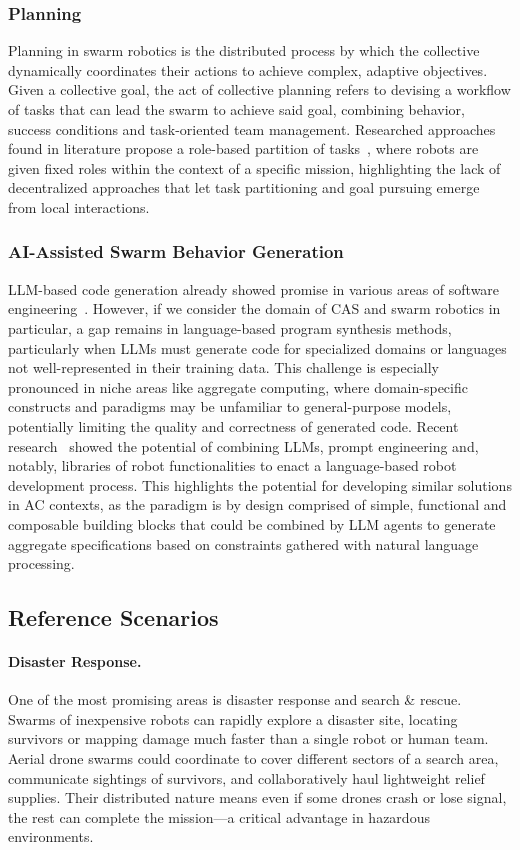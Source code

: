 \documentclass[12pt]{article}
\begin{document}
\subsubsection{Planning}
Planning in swarm robotics is the distributed process by which the collective dynamically coordinates their actions to achieve complex, adaptive objectives.
Given a collective goal, the act of collective planning refers to devising a workflow of tasks that can lead the swarm to achieve said goal, combining behavior, success conditions and task-oriented team management.
Researched approaches found in literature propose a role-based partition of tasks~\cite{sampedro2016flexible}, where robots are given fixed roles within the context of a specific mission, highlighting the lack
of decentralized approaches that let task partitioning and goal pursuing emerge from local interactions.

\subsubsection{AI-Assisted Swarm Behavior Generation}
LLM-based code generation already showed promise in various areas of software engineering~\cite{hudson2024software,zhou2025large,he2025llm}. However, if we consider the domain of CAS and swarm robotics in particular, 
a gap remains in language-based program synthesis methods, particularly when LLMs must generate code for specialized domains or languages not well-represented in their training data. This challenge is especially pronounced in niche areas like aggregate computing, where domain-specific constructs and paradigms may be unfamiliar to general-purpose models, potentially limiting the quality and correctness of generated code.
Recent research~\cite{vemprala2024chatgpt} showed the potential of combining LLMs, prompt engineering and, notably, libraries of robot functionalities 
to enact a language-based robot development process. This highlights the potential for developing similar solutions in AC contexts, as the paradigm is by design comprised of simple, functional and composable building blocks that could
be combined by LLM agents to generate aggregate specifications based on constraints gathered with natural language processing.

\subsection{Reference Scenarios}
\label{sec:scenarios}

\paragraph{Disaster Response.} One of the most promising areas is disaster response and search \& rescue. Swarms of inexpensive robots can rapidly explore a disaster site, 
locating survivors or mapping damage much faster than a single robot or human team. 
Aerial drone swarms could coordinate to cover different sectors of a search area, communicate sightings of survivors, and collaboratively haul lightweight relief supplies. 
Their distributed nature means even if some drones crash or lose signal, the rest can complete the mission---a critical advantage in hazardous environments.
\end{document}
